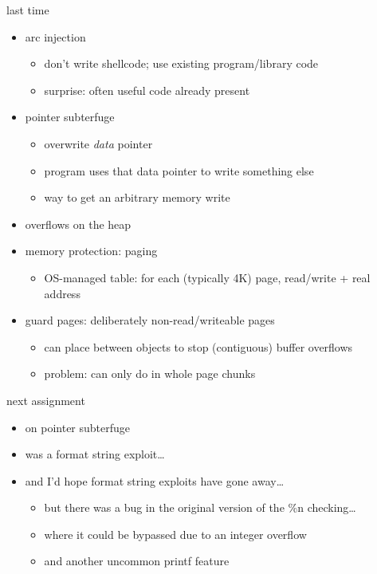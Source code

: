 \graphicspath{{./figures/}}
\title{}
\date{}

\begin{frame}
    \titlepage
\end{frame}
\begin{frame}{last time}
    \begin{itemize}
    \item arc injection
        \begin{itemize}
        \item don't write shellcode; use existing program/library code
        \item surprise: often useful code already present
        \end{itemize}
    \item pointer subterfuge
        \begin{itemize}
        \item overwrite \textit{data} pointer
        \item program uses that data pointer to write something else
        \item way to get an arbitrary memory write
        \end{itemize}
    \item overflows on the heap
    \item memory protection: paging
        \begin{itemize}
        \item OS-managed table: for each (typically 4K) page, read/write + real address
        \end{itemize}
    \item guard pages: deliberately non-read/writeable pages
        \begin{itemize}
        \item can place between objects to stop (contiguous) buffer overflows
        \item problem: can only do in whole page chunks
        \end{itemize}
    \end{itemize}
\end{frame}

\begin{frame}{next assignment}
    \begin{itemize}
    \item on pointer subterfuge
    \vspace{.5cm}
    \item was a format string exploit\ldots
    \item and I'd hope format string exploits have gone away\ldots
        \begin{itemize}
        \item but there was a bug in the original version of the \%n checking\ldots
        \item where it could be bypassed due to an integer overflow
        \item and another uncommon printf feature
        \end{itemize}
    \end{itemize}
\end{frame}

